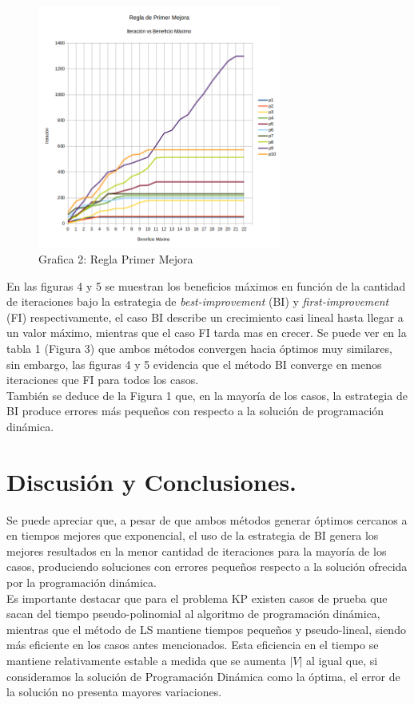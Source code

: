 \documentclass{ci5652}
\begin{document}
 	\begin{figure}[h]
 	\caption{Grafica 2: Regla Primer Mejora}
	\includegraphics[width=8cm, height=8cm]{first_imp-it-vs-ben_max.png}
	\end{figure}

	En las figuras 4 y 5 se muestran los beneficios máximos en función de la cantidad de iteraciones bajo la estrategia de \textit{best-improvement} (BI) y \textit{first-improvement} (FI) respectivamente, el caso BI describe un crecimiento casi lineal hasta llegar a un valor máximo, mientras que el caso FI tarda mas en crecer. Se puede ver en la tabla 1 (Figura 3) que ambos métodos convergen hacia óptimos muy similares, sin embargo, las figuras 4 y 5 evidencia que el método BI converge en menos iteraciones que FI para todos los casos.\\
	También se deduce de la Figura 1 que, en la mayoría de los casos, la estrategia de BI produce errores más pequeños con respecto a la solución de programación dinámica.\\

\section{Discusión y Conclusiones.}
	Se puede apreciar que, a pesar de que ambos métodos generar óptimos cercanos a en tiempos mejores que exponencial, el uso de la estrategia de BI genera los mejores resultados en la menor cantidad de iteraciones para la mayoría de los casos, produciendo soluciones con errores pequeños respecto a la solución ofrecida por la programación dinámica.\\

	Es importante destacar que para el problema KP existen casos de prueba que sacan del tiempo pseudo-polinomial al algoritmo de programación dinámica, mientras que el método de LS mantiene tiempos pequeños y pseudo-lineal, siendo más eficiente en los casos antes mencionados. Esta eficiencia en el tiempo se mantiene relativamente estable a medida que se aumenta $|V|$ al igual que, si consideramos la solución de Programación Dinámica como la óptima, el error de la solución no presenta mayores variaciones.\\
\end{document}
